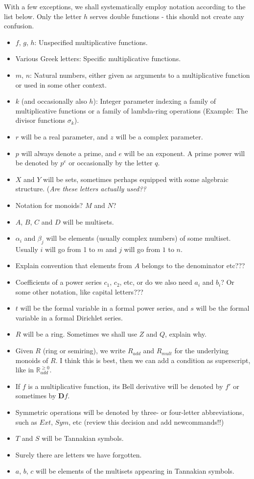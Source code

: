\documentclass[a4paper]{article}
\theoremstyle{definition}
\theoremstyle{remark}
\newcommand{\BD}{\mathbf{D}}
\begin{document}
With a few exceptions, we shall systematically employ notation according to the list below. Only the letter $h$ serves double functions - this should not create any confusion.
\begin{itemize}
\item $f$, $g$, $h$: Unspecified multiplicative functions.
\item Various Greek letters: Specific multiplicative functions.
\item $m$, $n$: Natural numbers, either given as arguments to a multiplicative function or used in some other context.
\item $k$ (and occasionally also $h$): Integer parameter indexing a family of multiplicative functions or a family of lambda-ring operations (Example: The divisor functions $\sigma_k$).
\item $r$ will be a real parameter, and $z$ will be a complex parameter.
\item $p$ will always denote a prime, and $e$ will be an exponent. A prime power will be denoted by $p^e$ or occasionally by the letter $q$.
\item $X$ and $Y$ will be sets, sometimes perhaps equipped with some algebraic structure. (\emph{Are these letters actually used??}
\item Notation for monoids? $M$ and $N$?
\item $A$, $B$, $C$ and $D$ will be multisets.
\item $\alpha_i$ and $\beta_j$ will be elements (usually complex numbers) of some multiset. Usually $i$ will go from 1 to $m$ and $j$ will go from $1$ to $n$.
\item Explain convention that elements from $A$ belongs to the denominator etc???
\item Coefficients of a power series $c_1$, $c_2$, etc, or do we also need $a_i$ and $b_i$? Or some other notation, like capital letters???
\item $t$ will be the formal variable in a formal power series, and $s$ will be the formal variable in a formal Dirichlet series.
\item $R$ will be a ring. Sometimes we shall use $Z$ and $Q$, explain why.
\item Given $R$ (ring or semiring), we write $R_{add}$ and $R_{mult}$ for the underlying monoids of $R$. I think this is best, then we can add a condition as superscript, like in $\mathbb{R}_{add}^{\geq 0}$.
\item If $f$ is a multiplicative function, its Bell derivative will be denoted by $f'$ or sometimes by $\BD f$. 
\item Symmetric operations will be denoted by three- or four-letter abbreviations, such as $Ext$, $Sym$, etc (review this decision and add newcommands!!)
\item $T$ and $S$ will be Tannakian symbols.
\item Surely there are letters we have forgotten. 
\item $a$, $b$, $c$ will be elements of the multisets appearing in Tannakian symbols.
\end{itemize}
\end{document}
